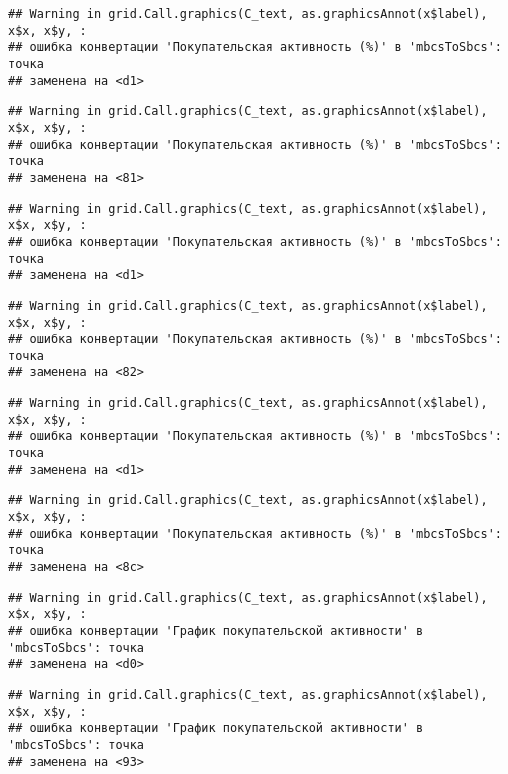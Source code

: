 \documentclass[
]{article}
\begin{document}
\begin{verbatim}
## Warning in grid.Call.graphics(C_text, as.graphicsAnnot(x$label), x$x, x$y, :
## ошибка конвертации 'Покупательская активность (%)' в 'mbcsToSbcs': точка
## заменена на <d1>
\end{verbatim}

\begin{verbatim}
## Warning in grid.Call.graphics(C_text, as.graphicsAnnot(x$label), x$x, x$y, :
## ошибка конвертации 'Покупательская активность (%)' в 'mbcsToSbcs': точка
## заменена на <81>
\end{verbatim}

\begin{verbatim}
## Warning in grid.Call.graphics(C_text, as.graphicsAnnot(x$label), x$x, x$y, :
## ошибка конвертации 'Покупательская активность (%)' в 'mbcsToSbcs': точка
## заменена на <d1>
\end{verbatim}

\begin{verbatim}
## Warning in grid.Call.graphics(C_text, as.graphicsAnnot(x$label), x$x, x$y, :
## ошибка конвертации 'Покупательская активность (%)' в 'mbcsToSbcs': точка
## заменена на <82>
\end{verbatim}

\begin{verbatim}
## Warning in grid.Call.graphics(C_text, as.graphicsAnnot(x$label), x$x, x$y, :
## ошибка конвертации 'Покупательская активность (%)' в 'mbcsToSbcs': точка
## заменена на <d1>
\end{verbatim}

\begin{verbatim}
## Warning in grid.Call.graphics(C_text, as.graphicsAnnot(x$label), x$x, x$y, :
## ошибка конвертации 'Покупательская активность (%)' в 'mbcsToSbcs': точка
## заменена на <8c>
\end{verbatim}

\begin{verbatim}
## Warning in grid.Call.graphics(C_text, as.graphicsAnnot(x$label), x$x, x$y, :
## ошибка конвертации 'График покупательской активности' в 'mbcsToSbcs': точка
## заменена на <d0>
\end{verbatim}

\begin{verbatim}
## Warning in grid.Call.graphics(C_text, as.graphicsAnnot(x$label), x$x, x$y, :
## ошибка конвертации 'График покупательской активности' в 'mbcsToSbcs': точка
## заменена на <93>
\end{verbatim}
\end{document}

